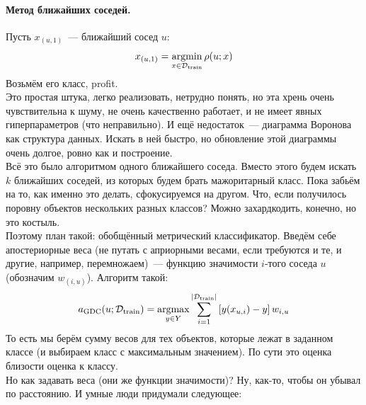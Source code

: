 \documentclass{article}
\begin{document}
    \paragraph{Метод ближайших соседей.}
    Пусть $x_{(u,1)}$~--- ближайший сосед $u$:
    \[
    x_{(u,1)}=\operatorname*{argmin}_{x\in{\mathcal{D}}_{\mathrm{train}}}\rho(u;x)
    \]
    Возьмём его класс, profit.\\
    Это простая штука, легко реализовать, нетрудно понять, но эта хрень очень чувствительна к шуму, не очень качественно работает, и не имеет явных гиперпараметров (что неправильно). И ещё недостаток~--- диаграмма Воронова как структура данных. Искать в ней быстро, но обновление этой диаграммы очень долгое, ровно как и построение.\\
    Всё это было алгоритмом одного ближайшего соседа. Вместо этого будем искать $k$ ближайших соседей, из которых будем брать мажоритарный класс. Пока забьём на то, как именно это делать, сфокусируемся на другом. Что, если получилось поровну объектов нескольких разных классов? Можно захардкодить, конечно, но это костыль.\\
    Поэтому план такой: обобщённый метрический классификатор. Введём себе апостериорные веса (не путать с априорными весами, если требуются и те, и другие, например, перемножаем)~--- функцию значимости $i$-того соседа $u$ (обозначим $w_{(i,u)}$). Алгоритм такой:
    \[
    a_{\mathrm{GDC}}(u;{\mathcal{D}}_{\mathrm{train}})=\operatorname*{argmax}_{y\in Y}\sum\limits_{i=1}^{|{\mathcal{D}}_{\mathrm{train}}|}\left[y(x_{u,i})-y\right]w_{i,u}
    \]
    То есть мы берём сумму весов для тех объектов, которые лежат в заданном классе (и выбираем класс с максимальным значением). По сути это оценка близости оценка к классу.\\
    Но как задавать веса (они же функции значимости)? Ну, как-то, чтобы он убывал по расстоянию. И умные люди придумали следующее:
\end{document}
